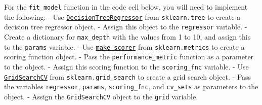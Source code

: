 \documentclass{article}
\begin{document}
For the \texttt{fit\_model} function in the code cell below, you will
need to implement the following: - Use
\href{http://scikit-learn.org/stable/modules/generated/sklearn.tree.DecisionTreeRegressor.html}{\texttt{DecisionTreeRegressor}}
from \texttt{sklearn.tree} to create a decision tree regressor object. -
Assign this object to the
\texttt{\textquotesingle{}regressor\textquotesingle{}} variable. -
Create a dictionary for
\texttt{\textquotesingle{}max\_depth\textquotesingle{}} with the values
from 1 to 10, and assign this to the
\texttt{\textquotesingle{}params\textquotesingle{}} variable. - Use
\href{http://scikit-learn.org/stable/modules/generated/sklearn.metrics.make_scorer.html}{\texttt{make\_scorer}}
from \texttt{sklearn.metrics} to create a scoring function object. -
Pass the \texttt{performance\_metric} function as a parameter to the
object. - Assign this scoring function to the
\texttt{\textquotesingle{}scoring\_fnc\textquotesingle{}} variable. -
Use
\href{http://scikit-learn.org/stable/modules/generated/sklearn.grid_search.GridSearchCV.html}{\texttt{GridSearchCV}}
from \texttt{sklearn.grid\_search} to create a grid search object. -
Pass the variables
\texttt{\textquotesingle{}regressor\textquotesingle{}},
\texttt{\textquotesingle{}params\textquotesingle{}},
\texttt{\textquotesingle{}scoring\_fnc\textquotesingle{}}, and
\texttt{\textquotesingle{}cv\_sets\textquotesingle{}} as parameters to
the object. - Assign the \texttt{GridSearchCV} object to the
\texttt{\textquotesingle{}grid\textquotesingle{}} variable.
\end{document}
